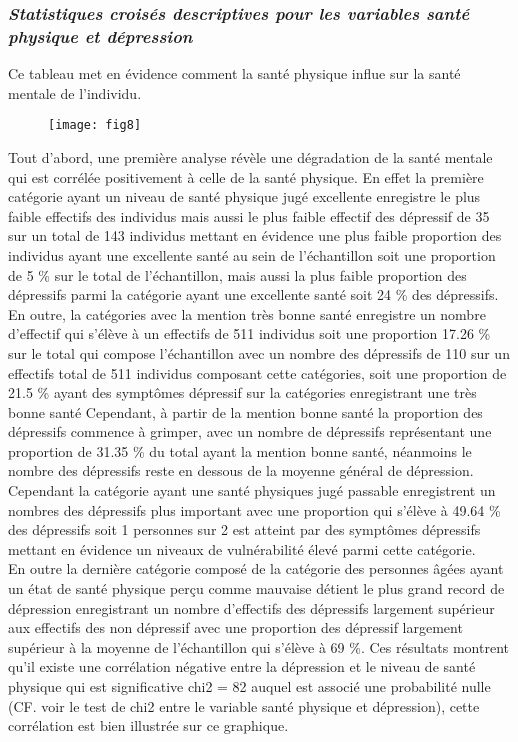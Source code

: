 \documentclass[a4paper]{article}
\begin{document}
\subsubsection{\textit{Statistiques croisés descriptives pour les variables santé physique et dépression }}

Ce tableau met en évidence comment la santé physique influe sur la santé mentale de l'individu.

\begin{figure}[h!]
	\centering
	\texttt{[image: fig8]}
	\label{fig:santé physique et dépression}
\end{figure}

Tout d’abord, une première analyse révèle une dégradation de la santé mentale qui est corrélée positivement à celle de la santé physique. 
En effet la première catégorie ayant un niveau de santé physique jugé excellente  enregistre le plus faible effectifs des individus mais aussi le plus faible effectif des dépressif  de 35 sur un total de 143 individus mettant en évidence une plus faible proportion des individus ayant une excellente santé au sein de l'échantillon soit une proportion de 5 \% sur le total de l'échantillon, mais aussi la plus faible proportion des dépressifs parmi la catégorie ayant une excellente santé soit 24 \% des dépressifs.
En outre, la catégories avec la mention très bonne santé  enregistre un nombre d’effectif  qui s’élève à un effectifs de 511 individus soit  une proportion 17.26 \% sur le total qui compose l'échantillon avec un nombre des dépressifs de 110 sur un effectifs total de 511 individus composant cette catégories, soit une proportion de  21.5 \% ayant des symptômes dépressif sur la catégories enregistrant une très bonne santé
Cependant, à partir de la mention bonne santé la proportion des dépressifs commence à grimper, avec un nombre de dépressifs représentant  une proportion de 31.35 \% du total ayant la mention bonne santé, néanmoins le nombre des dépressifs reste en dessous de la moyenne général de dépression. Cependant la catégorie ayant une santé physiques jugé passable enregistrent un nombres des dépressifs plus important avec une proportion qui s'élève à 49.64 \% des dépressifs soit 1 personnes sur 2 est atteint par des symptômes dépressifs mettant en évidence un niveaux de vulnérabilité élevé parmi cette catégorie.\\  
En outre la dernière catégorie composé de la catégorie des personnes âgées ayant un état de santé physique perçu comme mauvaise  détient le plus grand record de dépression enregistrant un nombre d'effectifs des dépressifs largement supérieur aux effectifs des non dépressif avec une proportion des dépressif largement supérieur à la moyenne de l'échantillon qui s’élève à 69 \%.
Ces résultats montrent qu’il existe une corrélation négative entre la dépression et le niveau de santé physique qui est significative chi2 = 82 auquel est associé une probabilité nulle (CF. voir le test de chi2 entre le variable santé physique et dépression), cette corrélation est bien illustrée sur ce graphique.
\end{document}
